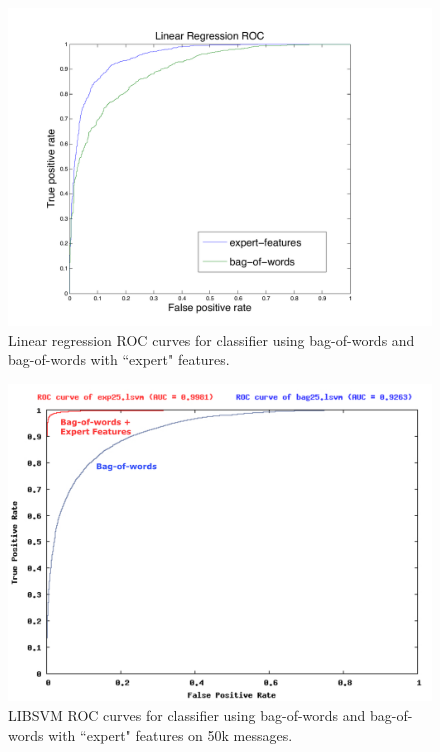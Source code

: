 \documentclass[preprint]{acm_proc_article-sp}
\begin{document}
\begin{tabular}
{\begin{figure}[h]
    \centering
    \includegraphics[width=\linewidth]{figures/linear-roc.pdf}
    \caption{Linear regression ROC curves for classifier using bag-of-words and bag-of-words with ``expert" features.}
    \label{fig:roclin}
\end{figure}

\begin{figure}[h]
    \centering
    \includegraphics[width=\linewidth]{figures/roc-25.pdf}
    \caption{LIBSVM ROC curves for classifier using bag-of-words and bag-of-words with ``expert" features on 50k messages.}
    \label{fig:roc-25}
\end{figure}


}
\end{tabular}
\end{document}
